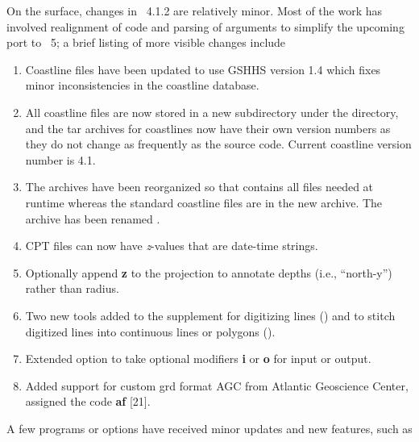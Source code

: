 On the surface, changes in \GMT\ 4.1.2 are relatively minor.  Most of the work has involved
realignment of code and parsing of arguments to simplify the upcoming port to \GMT\ 5;
a brief listing of more visible changes include

\begin{enumerate}
\item Coastline files have been updated to use GSHHS version 1.4 which fixes minor inconsistencies
in the coastline database.
\item All coastline files are now stored in a new subdirectory  under the
 directory, and the tar archives for coastlines now have their own version numbers
as they do not change as frequently as the source code.  Current coastline version number is 4.1.
\item The archives have been reorganized so that  contains all files needed
at runtime whereas the standard coastline files are in the new  archive.
The  archive has been renamed .
\item CPT files can now have \emph{z}-values that are date-time strings.
\item Optionally append \textbf{z} to the  projection to annotate depths (i.e., ``north-y'') rather than radius.
\item Two new tools added to the  supplement for digitizing lines () and
to stitch digitized lines into continuous lines or polygons ().
\item Extended  option to take optional modifiers \textbf{i} or \textbf{o} for input or output.
\item Added support for custom grd format AGC from Atlantic Geoscience Center, assigned the code \textbf{af} [21].
\end{enumerate}

A few programs or options have received minor updates and new features, such as

